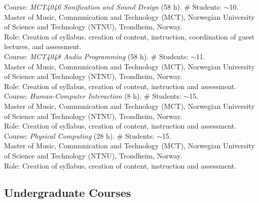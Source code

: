 \documentclass[10pt, a4paper]{article}
\newcommand{\years}[1]{\marginnote{\scriptsize #1}}
\begin{document}
\years{1/2019}Course: \emph{MCT4046 Sonification and Sound Design} (58 h). \# Students: $\sim$10. \\
Master of Music, Communication and Technology (MCT), Norwegian University of Science and Technology (NTNU), Trondheim, Norway.\\ 
Role: Creation of syllabus, creation of content, instruction, coordination of guest lectures, and assessment.\\
\years{1/2019}Course: \emph{MCT4048 Audio Programming} (58 h). \# Students: $\sim$11. \\
Master of Music, Communication and Technology (MCT), Norwegian University of Science and Technology (NTNU), Trondheim, Norway.\\ 
Role: Creation of syllabus, creation of content, instruction and assessment.\\
\years{10/2018}Course: \emph{Human-Computer Interaction} (8 h). \# Students: $\sim$15. \\
Master of Music, Communication and Technology (MCT), Norwegian University of Science and Technology (NTNU), Trondheim, Norway.\\ 
Role: Creation of syllabus, creation of content, instruction and assessment.\\
\years{10/2018}Course: \emph{Physical Computing} (28 h). \# Students: $\sim$15. \\
Master of Music, Communication and Technology (MCT), Norwegian University of Science and Technology (NTNU), Trondheim, Norway.\\ 
Role: Creation of syllabus, creation of content, instruction and assessment.


\subsection*{Undergraduate Courses}
\noindent
\end{document}
